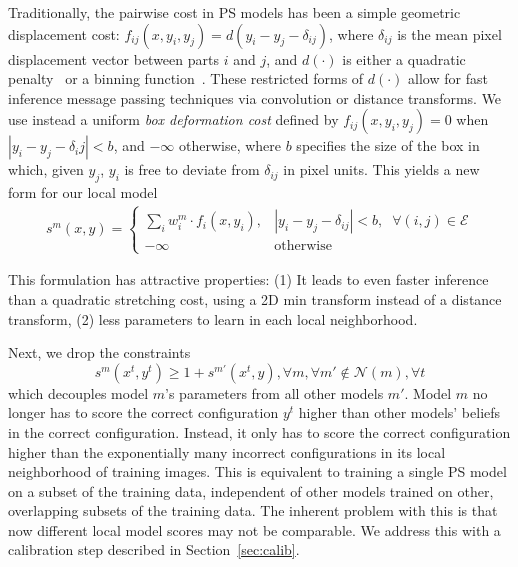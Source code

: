 Traditionally, the pairwise cost in PS models has been a simple geometric displacement cost: $f_{ij}(x,y_i,y_j) = d(y_i - y_j - \delta_{ij})$, where $\delta_{ij}$ is the mean pixel displacement vector between parts $i$ and $j$, and $d(\cdot)$ is either a quadratic penalty~\cite{felzps} or a binning function~\cite{deva2006}.  These restricted forms of $d(\cdot)$ allow for fast inference message passing techniques via convolution or distance transforms.  We use instead a uniform {\em box deformation cost} defined by $f_{ij}(x,y_i,y_j) = 0$ when $|y_i - y_j - \delta_ij| < b$, and $-\infty$ otherwise, where $b$ specifies the size of the box in which, given $y_j$, $y_i$ is free to deviate from $\delta_{ij}$ in pixel units.  This yields a new form for our local model 
\begin{align}\label{eqn:boxdist}
s^m(x,y) = 
\begin{cases}
 \sum_i w^m_i \cdot f_i(x,y_i), & |y_i - y_j - \delta_{ij}| < b,\;\; \forall (i,j) \in \mathcal{E} \\
 -\infty & \text{otherwise}
 \end{cases}
\end{align}

This formulation has attractive properties: (1) It leads to even faster inference than a quadratic stretching cost, using a 2D min transform instead of a distance transform, (2) less parameters to learn in each local neighborhood.

 Next, we drop the constraints
$$s^m(x^t,y^t) \geq 1 + s^{m'}(x^t,y), \forall m, \forall m'\notin \mathcal{N}(m),\forall t$$ 
which decouples model $m$'s parameters from all other models $m'$.  Model $m$ no longer has to score the correct configuration $y^t$ higher than other models' beliefs in the correct configuration.  Instead, it only has to score the correct configuration higher than the exponentially many incorrect configurations in its local neighborhood of training images.  This is equivalent to training a single PS model on a subset of the training data, independent of other models trained on other, overlapping subsets of the training data.  The inherent problem with this is that now different local model scores may not be comparable.  We address this with a calibration step described in Section~\ref{sec:calib}.

